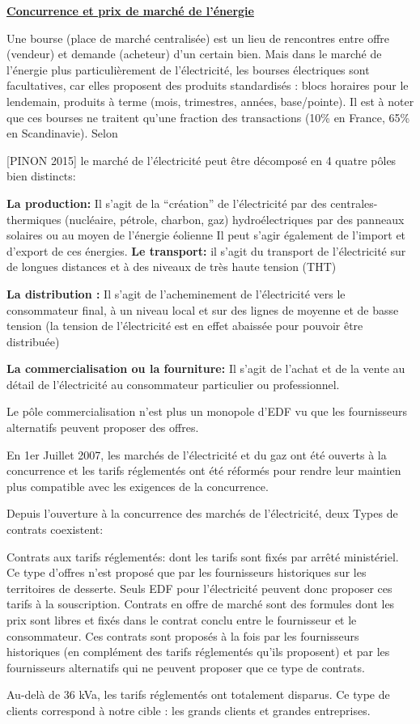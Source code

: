 \documentclass[12pt]{article}
\begin{document}
\textbf{\underline{Concurrence et prix de marché de l'énergie}}

Une bourse (place de marché centralisée) est un lieu de rencontres entre offre (vendeur) et demande (acheteur) d’un certain bien. 
Mais dans le marché de l'énergie plus particulièrement de l’électricité, les bourses électriques sont facultatives, car elles proposent des produits standardisés : blocs horaires pour le lendemain, produits à terme (mois, trimestres, années, base/pointe). Il est à noter que ces bourses ne traitent qu’une fraction des transactions (10\% en France, 65\% en Scandinavie). 
Selon {{\color{red}[PINON 2015]} le marché de l’électricité peut être décomposé en 4 quatre pôles bien distincts:
\begin{outline}
\1 \textbf{La production:} Il s’agit de la “création” de l’électricité par 
\2 des centrales-thermiques (nucléaire, pétrole, charbon, gaz) 
\2 hydroélectriques
\2 par des panneaux solaires ou au moyen de l’énergie éolienne Il peut s’agir également de l’import et d’export de ces énergies.
\1 \textbf{Le transport:} il s’agit du transport de l’électricité sur de longues distances et à des niveaux de très haute tension (THT) 

\1 \textbf{La distribution :} Il s’agit de l’acheminement de l’électricité vers le consommateur final, à un niveau local et sur des lignes de moyenne et de basse tension (la tension de l’électricité est en effet abaissée pour pouvoir être distribuée)

\1 \textbf{La commercialisation ou la fourniture:} Il s’agit de l’achat et de la vente au détail de l’électricité au consommateur particulier ou professionnel.
\end{outline}

Le pôle commercialisation n’est plus un monopole d’EDF vu que les fournisseurs alternatifs peuvent proposer des offres.

En 1er Juillet 2007, les marchés de l’électricité et du gaz ont été ouverts à la concurrence et les tarifs réglementés ont été réformés pour rendre leur maintien plus compatible avec les exigences de la concurrence.

Depuis l’ouverture à la concurrence des marchés de l’électricité, deux Types de contrats coexistent:
\begin{outline}
\1 Contrats aux tarifs réglementés: dont les tarifs sont fixés par arrêté ministériel.
Ce type d’offres n’est proposé que par les fournisseurs historiques sur les territoires de desserte. Seuls EDF pour l’électricité peuvent donc proposer ces tarifs à la souscription. 
\1 Contrats en offre de marché sont des formules dont les prix sont libres et fixés dans le contrat conclu entre le fournisseur et le consommateur. Ces contrats sont proposés à la fois par les fournisseurs historiques (en complément des tarifs réglementés qu’ils proposent) et par les fournisseurs alternatifs qui ne peuvent proposer que ce type de contrats. 
\end{outline}
Au-delà de 36 kVa, les tarifs réglementés ont totalement disparus. Ce type de clients correspond à notre cible : les grands clients et grandes entreprises.

}
\end{document}
